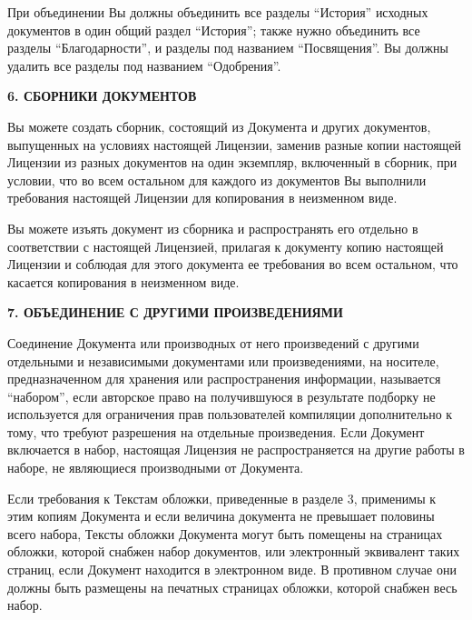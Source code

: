 При объединении Вы должны объединить все разделы \enquote{История}
исходных документов в один общий раздел \enquote{История}; также нужно
объединить все разделы \enquote{Благодарности}, и разделы под
названием \enquote{Посвящения}. Вы должны удалить все разделы под
названием \enquote{Одобрения}.

\begin{center}
{\Large\bf 6. СБОРНИКИ ДОКУМЕНТОВ\par}
\end{center}

Вы можете создать сборник, состоящий из Документа и других документов,
выпущенных на условиях настоящей Лицензии, заменив разные копии
настоящей Лицензии из разных документов на один экземпляр, включенный
в сборник, при условии, что во всем остальном для каждого из
документов Вы выполнили требования настоящей Лицензии для копирования
в неизменном виде.

Вы можете изъять документ из сборника и распространять его отдельно в
соответствии с настоящей Лицензией, прилагая к документу копию
настоящей Лицензии и соблюдая для этого документа ее требования во
всем остальном, что касается копирования в неизменном виде.

\begin{center}
{\Large\bf 7. ОБЪЕДИНЕНИЕ С ДРУГИМИ ПРОИЗВЕДЕНИЯМИ\par}
\end{center}

Соединение Документа или производных от него произведений с другими
отдельными и независимыми документами или произведениями, на носителе,
предназначенном для хранения или распространения информации,
называется \enquote{набором}, если авторское право на получившуюся в
результате подборку не используется для ограничения прав пользователей
компиляции дополнительно к тому, что требуют разрешения на отдельные
произведения. Если Документ включается в набор, настоящая Лицензия не
распространяется на другие работы в наборе, не являющиеся производными
от Документа.

Если требования к Текстам обложки, приведенные в разделе 3, применимы
к этим копиям Документа и если величина документа не превышает
половины всего набора, Тексты обложки Документа могут быть помещены на
страницах обложки, которой снабжен набор документов, или электронный
эквивалент таких страниц, если Документ находится в электронном
виде. В противном случае они должны быть размещены на печатных
страницах обложки, которой снабжен весь набор.

